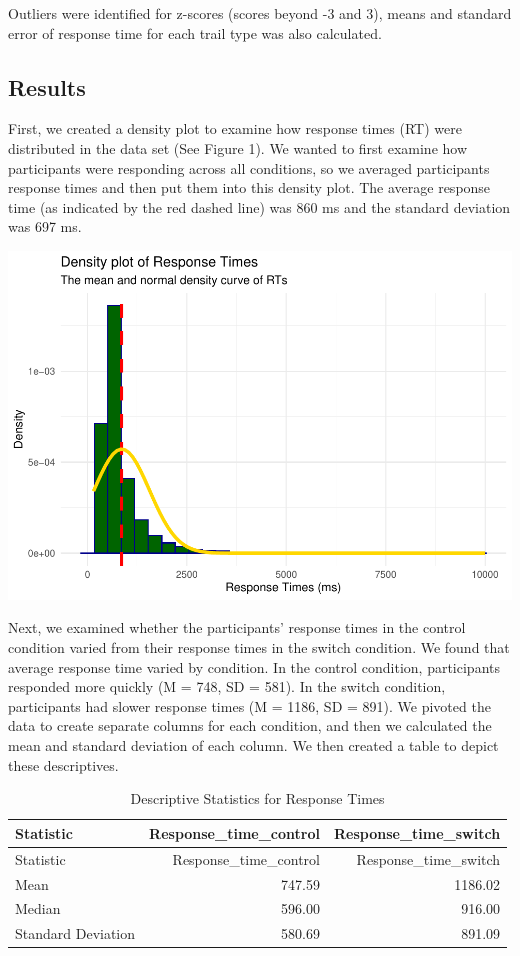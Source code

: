 \documentclass[
  11pt,
]{article}
\begin{document}
Outliers were identified for z-scores (scores beyond -3 and 3), means
and standard error of response time for each trail type was also
calculated.

\subsection{Results}\label{results}

First, we created a density plot to examine how response times (RT) were
distributed in the data set (See Figure 1). We wanted to first examine
how participants were responding across all conditions, so we averaged
participants response times and then put them into this density plot.
The average response time (as indicated by the red dashed line) was 860
ms and the standard deviation was 697 ms.

\includegraphics{final_paper_EDLD_files/figure-latex/unnamed-chunk-3-1.pdf}

Next, we examined whether the participants' response times in the
control condition varied from their response times in the switch
condition. We found that average response time varied by condition. In
the control condition, participants responded more quickly (M = 748, SD
= 581). In the switch condition, participants had slower response times
(M = 1186, SD = 891). We pivoted the data to create separate columns for
each condition, and then we calculated the mean and standard deviation
of each column. We then created a table to depict these descriptives.

\begin{longtable}[]{@{}lrr@{}}
\caption{Descriptive Statistics for Response Times}\tabularnewline
\toprule\noalign{}
Statistic & Response\_time\_control & Response\_time\_switch \\
\midrule\noalign{}
\endfirsthead
\toprule\noalign{}
Statistic & Response\_time\_control & Response\_time\_switch \\
\midrule\noalign{}
\endhead
\bottomrule\noalign{}
\endlastfoot
Mean & 747.59 & 1186.02 \\
Median & 596.00 & 916.00 \\
Standard Deviation & 580.69 & 891.09 \\
\end{longtable}
\end{document}
